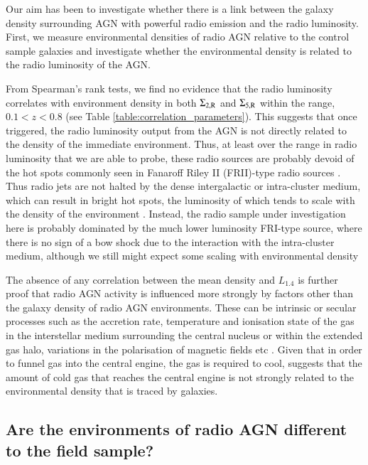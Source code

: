 Our aim has been to investigate whether there is a link between the galaxy density surrounding AGN with powerful radio emission and the radio luminosity. First, we measure environmental densities of radio AGN relative to the control sample galaxies and investigate whether the environmental density is related to the radio luminosity of the AGN.

From Spearman's rank tests, we find no evidence that the radio luminosity correlates with environment density in both $\Sigma_{2,\rm{R}}$ and $\Sigma_{5,\rm{R}}$ within the range, $0.1 < z < 0.8$ (see Table \ref{table:correlation_parameters}). This suggests that once triggered, the radio luminosity output from the AGN is not directly related to the density of the immediate environment. Thus, at least over the range in radio luminosity that we are able to probe, these radio sources are probably devoid of the hot spots commonly seen in Fanaroff Riley II (FRII)-type radio sources \citep[e.g.][]{FanaroffRiley1974}. Thus radio jets are not halted by the dense intergalactic or intra-cluster medium, which can result in bright hot spots, the luminosity of which tends to scale with the density of the environment \citep[e.g.][]{HardcastleKrause2013}. Instead, the radio sample under investigation here is probably dominated by the much lower luminosity FRI-type source, where there is no sign of a bow shock due to the interaction with the intra-cluster medium, although we still might expect some scaling with environmental density \citep[e.g.][]{LaingBridle2014}

The absence of any correlation between the mean density and $L_{1.4}$ is further proof that radio AGN activity is influenced more strongly by factors other than the galaxy density of radio AGN environments. These can be intrinsic or secular processes such as the accretion rate, temperature and ionisation state of the gas in the interstellar medium surrounding the central nucleus or within the extended gas halo, variations in the polarisation of magnetic fields etc \citep[e.g][]{hardcastle2007a,sabater2015,osullivan2015}.
Given that in order to funnel gas into the central engine, the gas is required to cool, suggests that the amount of cold gas that reaches the central engine is not strongly related to the environmental density that is traced by galaxies.

\subsection{Are the environments of radio AGN different to the field sample?}

